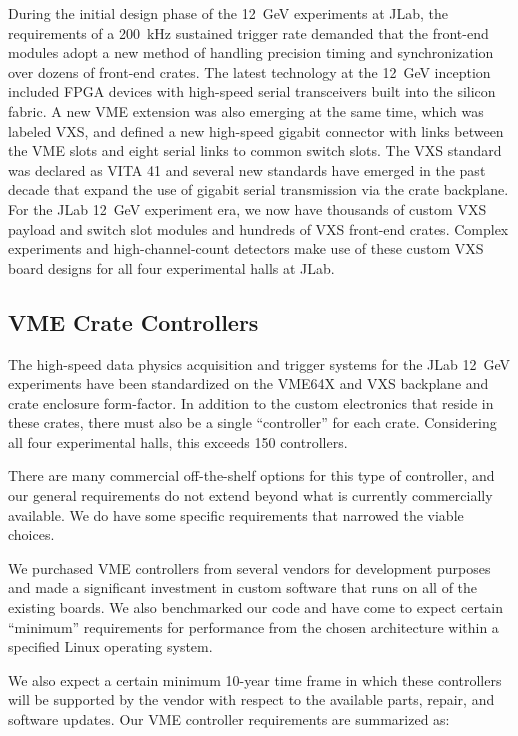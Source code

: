 During the initial design phase of the 12~GeV experiments at JLab, the requirements of a 200~kHz sustained trigger
rate demanded that the front-end modules adopt a new method of handling precision timing and synchronization over
dozens of front-end crates. The latest technology at the 12~GeV inception included FPGA devices with high-speed serial
transceivers built into the silicon fabric. A new VME extension was also emerging at the same time, which was labeled
VXS, and defined a new high-speed gigabit connector with links between the VME slots and eight serial links to common
switch slots. The VXS standard was declared as VITA 41 and several new standards have emerged in the past decade
that expand the use of gigabit serial transmission via the crate backplane. For the JLab 12~GeV experiment era, we
now have thousands of custom VXS payload and switch slot modules and hundreds of VXS front-end crates. Complex
experiments and high-channel-count detectors make use of these custom VXS board designs for all four experimental
halls at JLab.

\subsection{VME Crate Controllers}

The high-speed data physics acquisition and trigger systems for the JLab 12~GeV experiments have been standardized
on the VME64X and VXS backplane and crate enclosure form-factor. In addition to the custom electronics that reside in
these crates, there must also be a single ``controller'' for each crate. Considering all four experimental halls, this
exceeds 150 controllers.

There are many commercial off-the-shelf options for this type of controller, and our general requirements do not
extend beyond what is currently commercially available. We do have some specific requirements that narrowed the viable
choices.

We purchased VME controllers from several vendors for development purposes and made a significant investment in
custom software that runs on all of the existing boards. We also benchmarked our code and have come to expect
certain ``minimum'' requirements for performance from the chosen architecture within a specified Linux operating
system.

We also expect a certain minimum 10-year time frame in which these controllers will be supported by the vendor with
respect to the available parts, repair, and software updates. Our VME controller requirements are summarized as:

